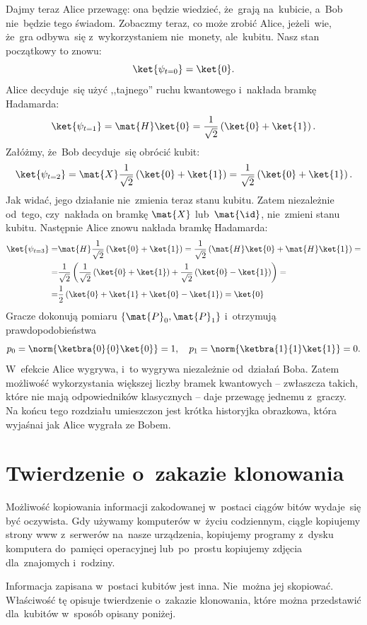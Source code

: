 Dajmy teraz Alice przewagę: ona będzie wiedzieć, że~grają na~kubicie, a~Bob nie~będzie tego świadom.
Zobaczmy teraz, co może zrobić Alice, jeżeli~wie, że~gra odbywa~się z~wykorzystaniem nie~monety, ale~kubitu.
Nasz stan początkowy to znowu:
$$
	\ket{\psi_{t=0}}=\ket{0}.
$$
Alice decyduje~się użyć ,,tajnego'' ruchu kwantowego i~nakłada bramkę Hadamarda:
$$
	\ket{\psi_{t=1}}=\mat{H}\ket{0}=\frac{1}{\sqrt{2}}\left(\ket{0}+\ket{1}\right).
$$
Załóżmy, że~Bob decyduje~się obrócić kubit:
$$
	\ket{\psi_{t=2}}=\mat{X}\frac{1}{\sqrt{2}}\left(\ket{0}+\ket{1}\right)=\frac{1}{\sqrt{2}}\left(\ket{0}+\ket{1}\right).
$$
Jak widać, jego działanie nie~zmienia teraz stanu kubitu. Zatem niezależnie od~tego, czy~nakłada on bramkę $\mat{X}$ lub~$\mat{\id}$, nie~zmieni stanu kubitu.
Następnie Alice znowu nakłada bramkę Hadamarda:
\begin{equation*}
	\begin{split}
		\ket{\psi_{t=3}}=&\mat{H}\frac{1}{\sqrt{2}}\left(\ket{0}+\ket{1}\right)=
		\frac{1}{\sqrt{2}}\left(\mat{H}\ket{0}+\mat{H}\ket{1}\right)=\\
		=&\frac{1}{\sqrt{2}}\left(\frac{1}{\sqrt{2}}\left(\ket{0}+\ket{1}\right)+
		\frac{1}{\sqrt{2}}\left(\ket{0}-\ket{1}\right)\right)=\\
		=&\frac{1}{2}\left(\ket{0}+\ket{1}+\ket{0}-\ket{1}\right)=
		\ket{0}
	\end{split}
\end{equation*}
Gracze dokonują pomiaru $\{\mat{P}_0,\mat{P}_1\}$ i~otrzymują prawdopodobieństwa
$$
	p_0=\norm{\ketbra{0}{0}\ket{0}}=1, \quad p_1=\norm{\ketbra{1}{1}\ket{1}}=0.
$$
W~efekcie Alice wygrywa, i~to wygrywa niezależnie od~działań Boba.
Zatem możliwość wykorzystania większej liczby bramek kwantowych -- zwłaszcza takich,
które nie mają odpowiedników klasycznych -- daje przewagę jednemu z~graczy.
Na końcu tego rozdziału umieszczon jest krótka
historyjka obrazkowa, która wyjaśnai jak Alice wygrała ze Bobem.

\section{Twierdzenie o~zakazie klonowania}
Możliwość kopiowania informacji zakodowanej w~postaci ciągów bitów wydaje~się być oczywista.
Gdy używamy komputerów w~życiu codziennym, ciągle kopiujemy strony www z~serwerów na~nasze urządzenia,
kopiujemy programy z~dysku komputera do~pamięci operacyjnej lub~po~prostu kopiujemy zdjęcia dla~znajomych i~rodziny.

Informacja zapisana w~postaci kubitów jest inna. Nie~można jej skopiować. Właściwość tę opisuje
twierdzenie o~zakazie klonowania, które można przedstawić dla~kubitów w~sposób opisany poniżej.


